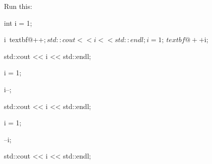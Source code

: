  Run this:

\begin{console}[commandchars=\~\@\$]

{

int i = 1;



i~textbf@++$;

std::cout << i << std::endl;



i = 1;

~textbf@++$i;

std::cout << i << std::endl;



i = 1;

i--;

std::cout << i << std::endl;



i = 1;

--i;

std::cout << i << std::endl;

}

\end{console}

